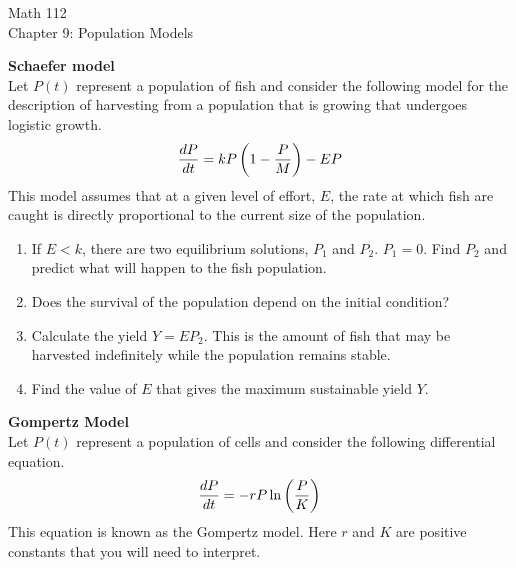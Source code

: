 \documentclass[11pt]{article}
\begin{document}
\begin{center}
\Large
\rm{Math 112}
\\
\rm{Chapter 9:   Population Models}
\\
\vspace{0.2in}

\end{center}

{\bf Schaefer model}\\
Let $P(t)$ represent a population of fish and consider the following model for the description of harvesting from a population that is
growing that undergoes logistic growth.
\begin{displaymath}
\frac{dP}{dt} = kP\left(1-\frac{P}{M}\right) - EP \\
\end{displaymath}
This model assumes that at a given level of effort, $E$, the rate at which fish are caught is directly proportional to the current size of the
population.  

\begin{enumerate}
\item{If $E<k$, there are two equilibrium solutions, $P_1$ and $P_2$. $P_1=0$.  Find $P_2$ and predict what will happen to the fish population.}
\item{Does the survival of the population depend on the initial condition?}
\item{Calculate the yield $Y = EP_2$.  This is the amount of fish that may be harvested indefinitely while the population remains stable.}
\item{Find the value of $E$ that gives the maximum sustainable yield $Y$.}
\end{enumerate}


{\bf Gompertz Model}\\
Let $P(t)$ represent a population of cells and consider the following differential equation.  
\begin{displaymath}
\frac{dP}{dt} = -rP\ln{\left(\frac{P}{K} \right)} \\
\end{displaymath}
This equation is known as the Gompertz model.  Here $r$ and $K$ are positive constants that you will need to interpret.  
\end{document}
